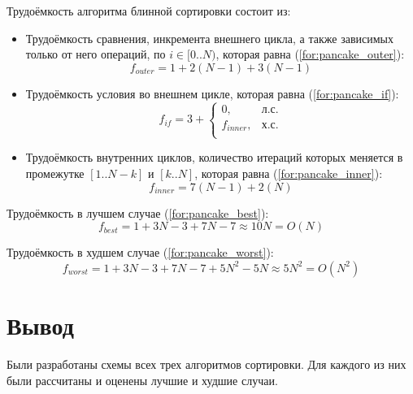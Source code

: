 Трудоёмкость алгоритма блинной сортировки состоит из:
\begin{itemize}
    \item Трудоёмкость сравнения, инкремента внешнего цикла, а также зависимых только от него операций, по $i \in [0..N)$, которая равна (\ref{for:pancake_outer}):
        \begin{equation}
            \label{for:pancake_outer}
            f_{outer} = 1 + 2(N - 1) + 3(N - 1)
        \end{equation}
    
    \item Трудоёмкость условия во внешнем цикле, которая равна (\ref{for:pancake_if}):
        \begin{equation}
            \label{for:pancake_if}
            f_{if} = 3 + \begin{cases}
                0, & \text{л.с.}\\
                f_{inner}, & \text{х.с.}\\
            \end{cases}
        \end{equation}
    \item Трудоёмкость внутренних циклов, количество итераций которых меняется в промежутке $[1..N-k]$ и $[k..N]$, которая равна (\ref{for:pancake_inner}):
        \begin{equation}
            \label{for:pancake_inner}
            f_{inner} = 7(N - 1) + 2(N)
        \end{equation}
\end{itemize}

Трудоёмкость в лучшем случае (\ref{for:pancake_best}):
\begin{equation}
    \label{for:pancake_best}
    f_{best} = 1 + 3N - 3 + 7N - 7 \approx 10N = O(N)
\end{equation}

Трудоёмкость в худшем случае (\ref{for:pancake_worst}):
\begin{equation}
    \label{for:pancake_worst}
    f_{worst} = 1 + 3N - 3 + 7N - 7 + 5N^2 - 5N \approx 5N^2 = O(N^2)
\end{equation}


\section*{Вывод}

Были разработаны схемы всех трех алгоритмов сортировки.
Для каждого из них были рассчитаны и оценены лучшие и худшие случаи.
